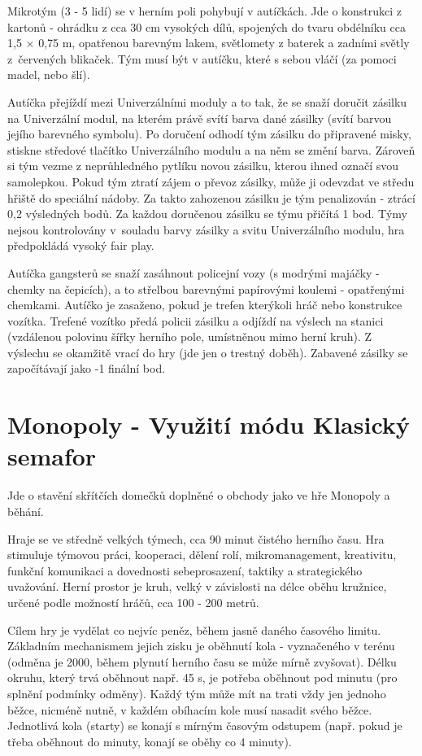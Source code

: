 Mikrotým (3 - 5 lidí) se v herním poli pohybují v autíčkách. Jde o konstrukci z kartonů - ohrádku z cca 30 cm vysokých dílů, spojených do tvaru obdélníku cca 1,5 $\times$ 0,75 m, opatřenou barevným 
lakem, světlomety z baterek a zadními světly z~červených blikaček. Tým musí být v autíčku, které s sebou vláčí (za pomoci madel, nebo šlí). 

Autíčka přejíždí mezi Univerzálními moduly a to tak, že se snaží doručit zásilku na Univerzální modul, na kterém právě svítí barva dané zásilky (svítí barvou jejího barevného symbolu). Po doručení odhodí tým zásilku do 
připravené misky, stiskne středové tlačítko Univerzálního modulu a na něm se změní barva. Zároveň si tým vezme z neprůhledného pytlíku novou zásilku, kterou ihned označí svou samolepkou. Pokud tým ztratí zájem o převoz 
zásilky, může ji odevzdat ve středu hřiště do speciální nádoby. Za takto zahozenou zásilku je tým penalizován - ztrácí 0,2 výsledných bodů. Za každou doručenou zásilku se týmu přičítá 1 bod. Týmy nejsou kontrolovány 
v~souladu barvy zásilky a svitu Univerzálního modulu, hra předpokládá vysoký fair play. 

Autíčka gangsterů se snaží zasáhnout policejní vozy (s modrými majáčky - chemky na čepicích), a to střelbou barevnými papírovými koulemi - opatřenými chemkami. Autíčko je zasaženo, pokud je trefen kterýkoli hráč nebo 
konstrukce vozítka. Trefené vozítko předá policii zásilku a odjíždí na výslech na stanici (vzdálenou polovinu šířky herního pole, umístněnou mimo herní kruh). Z výslechu se okamžitě vrací do hry (jde jen o trestný doběh). 
Zabavené zásilky se započítávají jako -1 finální bod. 

\newpage
\section{Monopoly - Využití módu Klasický semafor}
Jde o stavění skřítčích domečků doplněné o obchody jako ve hře Monopoly a běhání.

Hraje se ve středně velkých týmech, cca 90 minut čistého herního času. Hra stimuluje týmovou práci, kooperaci, dělení rolí, mikromanagement, kreativitu, funkční komunikaci a dovednosti sebeprosazení, taktiky a strategického 
uvažování. Herní prostor je kruh, velký v závislosti na délce oběhu kružnice, určené podle možností hráčů, cca 100 - 200 metrů.

Cílem hry je vydělat co nejvíc peněz, během jasně daného časového limitu. Základním mechanismem jejich zisku je oběhnutí kola - vyznačeného v terénu (odměna je 2000, během plynutí herního času se může mírně zvyšovat). Délku 
okruhu, který trvá oběhnout např. 45 s,  je potřeba oběhnout pod minutu (pro splnění podmínky odměny). Každý tým může mít na trati vždy jen jednoho běžce, nicméně nutně, v každém obíhacím kole musí nasadit svého běžce. Jednotlivá 
kola (starty) se konají s mírným časovým odstupem (např. pokud je třeba oběhnout do minuty, konají se oběhy co 4 minuty).


